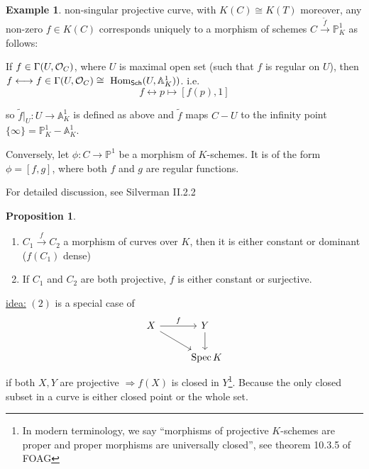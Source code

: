 \documentclass[11pt]{article}
\theoremstyle{definition}
\newtheorem{prop}[thm]{Proposition}
\newtheorem{ex}[thm]{Example}
\renewcommand{\hom}{\text{ Hom}}
\newcommand{\spec}{\text{ Spec}\,}
\newcommand{\affn}{\mathbb A}
\newcommand{\proj}{\mathbb P}
\newcommand{\calo}{{\cal O}}
\newcommand{\Lrta}{\Longrightarrow}
\newcommand{\lrta}{\longrightarrow}
\newcommand{\llrta}{\longleftrightarrow}
\begin{document}
 \begin{ex}\label{chap7ex:correspondence+rational functions_maps_to_proj_lilne}
  non-singular projective curve, with $K(C)\cong K(T)$ moreover, any non-zero $f\in K(C)$ corresponds uniquely to a morphism of schemes $C\overset{\tilde{f}}{\lrta}\proj^1_K$ as follows:
 
 If $f\in \Gamma(U,\calo_C)$, where $U$ is maximal open set (such that $f$ is regular on $U$), then  $f\llrta f\in \Gamma(U,\calo_C)\cong \hom_{\mathsf{Sch}}(U,\affn^1_K))$. i.e.
 $$
f\llrta p\mapsto [f(p),1]
 $$

 so $\tilde{f}|_U:U\lrta \affn^1_K$ is defined as above and $\tilde{f}$ maps $C-U$ to the infinity point $\{\infty\}=\proj^1_K-\affn^1_K$.

 Conversely, let $\phi: C\lrta \proj^1$ be a morphism of $K$-schemes. It is of the form
 $\phi=[f,g]$, where both $f$ and $g$ are regular functions.  

 For detailed discussion, see Silverman II.2.2
 \end{ex}
 \begin{prop}\ 
\begin{enumerate}[label=(\arabic*)]
\item $C_1\overset{f}{\lrta}C_2$ a morphism of curves over $K$, then it is either constant or dominant ($f(C_1)$ dense)
\item If $C_1$ and $C_2$ are both projective, $f$ is either constant or surjective. 
\end{enumerate}
 \end{prop}
\underline{idea:} $(2)$ is a special case of 
$$
\begin{tikzcd}
X \arrow[rd] \arrow[r, "f"] & Y \arrow[d] \\
 & \spec K
\end{tikzcd}
$$
if both $X,Y$ are projective $\Lrta f(X)$ is closed in $Y$\footnote{In modern terminology, we say ``morphisms of projective $K$-schemes are proper and proper morphisms are universally closed'', see theorem 10.3.5 of FOAG}. Because the only closed subset in a curve is either closed point or the whole set.
\end{document}
